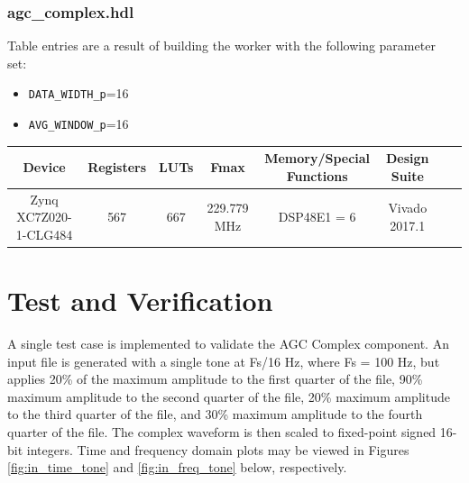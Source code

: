 \documentclass{article}
\def\comp{agc\_complex}
\def\Comp{AGC Complex}
\begin{document}
\subsubsection*{\comp.hdl}
Table entries are a result of building the worker with the following parameter set:\
\begin{itemize}
	\item \verb+DATA_WIDTH_p+=16
	\item \verb+AVG_WINDOW_p+=16
\end{itemize}
\begin{scriptsize}
	\begin{tabular}{|c|c|c|c|c|c|c|c|}
		\hline
		\rowcolor{blue}
		Device                      & Registers & LUTs & Fmax        & Memory/Special Functions & Design Suite       \\
		\hline
		Zynq XC7Z020-1-CLG484       & 567       & 667  & 229.779 MHz & DSP48E1 = 6              & Vivado 2017.1           \\
		\hline
	\end{tabular}
\end{scriptsize}

\section*{Test and Verification}
\begin{flushleft}
	A single test case is implemented to validate the {\Comp} component. An input file is generated with a single tone at Fs/16 Hz, where Fs = 100 Hz, but applies 20\% of the maximum amplitude to the first quarter of the file, 90\% maximum amplitude to the second quarter of the file, 20\% maximum amplitude to the third quarter of the file, and 30\% maximum amplitude to the fourth quarter of the file. The complex waveform is then scaled to fixed-point signed 16-bit integers. Time and frequency domain plots may be viewed in Figures \ref{fig:in_time_tone} and \ref{fig:in_freq_tone} below, respectively.
\end{flushleft}
\end{document}
